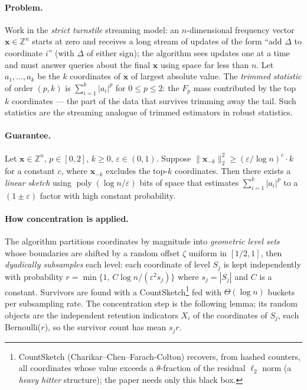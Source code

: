 \paragraph{Problem.}
Work in the \emph{strict turnstile} streaming model: an $n$-dimensional frequency vector
$\mathbf{x} \in \mathbb{Z}^n$ starts at zero and receives a long stream of updates of the
form ``add $\Delta$ to coordinate $i$'' (with $\Delta$ of either sign); the algorithm
sees updates one at a time and must answer queries about the final $\mathbf{x}$ using
space far less than $n$. Let $a_1,\dots,a_k$ be the $k$ coordinates of $\mathbf{x}$ of
largest absolute value. The \emph{trimmed statistic} of order $(p,k)$ is
$\sum_{i=1}^k |a_i|^p$ for $0 \le p \le 2$: the $F_p$ mass contributed by the top $k$
coordinates --- the part of the data that survives trimming away the tail. Such
statistics are the streaming analogue of trimmed estimators in robust statistics.

\paragraph{Guarantee.}

\begin{theorem}\label{thm:conc-trimmed}
Let $\mathbf{x} \in \mathbb{Z}^n$, $p \in [0,2]$, $k \ge 0$, $\varepsilon \in (0,1)$.
Suppose $\|\mathbf{x}_{-k}\|_2^2 \ge (\varepsilon/\log n)^c \cdot k$ for a constant $c$,
where $\mathbf{x}_{-k}$ excludes the top-$k$ coordinates. Then there exists a
\emph{linear sketch} using $\operatorname{poly}(\log n/\varepsilon)$ bits of space that
estimates $\sum_{i=1}^k |a_i|^p$ to a $(1\pm\varepsilon)$ factor with high constant
probability. \eop
\end{theorem}


\paragraph{How concentration is applied.}
The algorithm partitions coordinates by magnitude into \emph{geometric level sets} whose
boundaries are shifted by a random offset $\zeta$ uniform in $[1/2,1]$, then
\emph{dyadically subsamples} each level: each coordinate of level $S_j$ is kept
independently with probability $r = \min\{1,\, C\log n/(\varepsilon^2 s_j)\}$ where
$s_j = |S_j|$ and $C$ is a constant. Survivors are found with a
CountSketch\footnote{CountSketch (Charikar--Chen--Farach-Colton) recovers, from hashed
counters, all coordinates whose value exceeds a $\theta$-fraction of the residual
$\ell_2$ norm (a \emph{heavy hitter} structure); the paper needs only this black box.}
fed with $\Theta(\log n)$ buckets per subsampling rate. The concentration step is the
following lemma; its random objects are the independent retention indicators $X_i$ of
the coordinates of $S_j$, each Bernoulli($r$), so the survivor count has mean $s_j r$.

